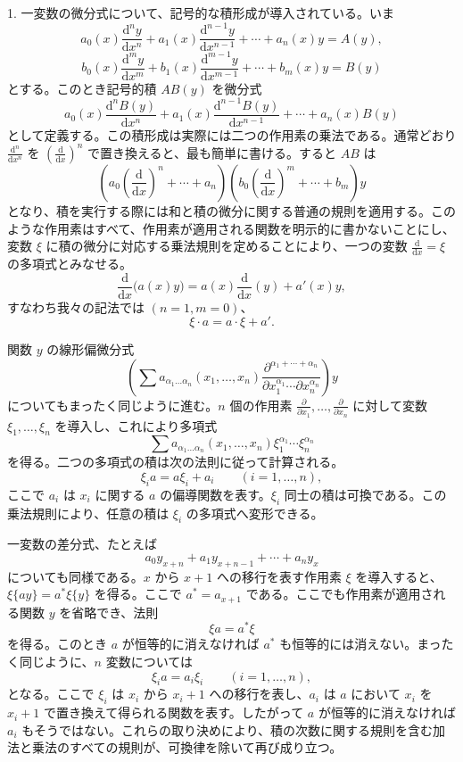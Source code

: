 \documentclass[11pt]{article}
\providecommand{\dd}{\mathrm d}
\providecommand{\p}{\partial}
\begin{document}
1. 一変数の微分式について、記号的な積形成が導入されている。いま
\[
 a_0(x)\frac{\dd^n y}{\dd x^n}+a_1(x)\frac{\dd^{n-1}y}{\dd x^{n-1}}+\cdots+a_n(x)y=A(y),
\]
\[
 b_0(x)\frac{\dd^m y}{\dd x^m}+b_1(x)\frac{\dd^{m-1}y}{\dd x^{m-1}}+\cdots+b_m(x)y=B(y)
\]
とする。このとき記号的積 $AB(y)$ を微分式
\[
 a_0(x)\frac{\dd^n B(y)}{\dd x^n}+a_1(x)\frac{\dd^{n-1}B(y)}{\dd x^{n-1}}+\cdots+a_n(x)B(y)
\]
として定義する。この積形成は実際には二つの作用素の乗法である。通常どおり $\frac{\dd^n}{\dd x^n}$ を $\left(\frac{\dd}{\dd x}\right)^n$ で置き換えると、最も簡単に書ける。すると $AB$ は
\[
 \left(a_0\left(\frac{\dd}{\dd x}\right)^n+\cdots+a_n\right)
 \left(b_0\left(\frac{\dd}{\dd x}\right)^m+\cdots+b_m\right)y
\]
となり、積を実行する際には和と積の微分に関する普通の規則を適用する。このような作用素はすべて、作用素が適用される関数を明示的に書かないことにし、変数 $\xi$ に積の微分に対応する乗法規則を定めることにより、一つの変数 $\frac{\dd}{\dd x}=\xi$ の多項式とみなせる。
\[
 \frac{\dd}{\dd x}\bigl(a(x)y\bigr)=a(x)\frac{\dd}{\dd x}(y)+a'(x)y,
\]
すなわち我々の記法では $(n=1,m=0)$、
\begin{equation}
 \xi\cdot a=a\cdot\xi+a'.
\tag{1}
\end{equation}

関数 $y$ の線形偏微分式
\[
 \left(\sum a_{\alpha_1\ldots\alpha_n}(x_1,\ldots,x_n)
 \frac{\p^{\alpha_1+\cdots+\alpha_n}}
 {\p x_1^{\alpha_1}\cdots\p x_n^{\alpha_n}}\right)y
\]
についてもまったく同じように進む。$n$ 個の作用素 $\frac{\p}{\p x_1},\ldots,\frac{\p}{\p x_n}$ に対して変数 $\xi_1,
\ldots,\xi_n$ を導入し、これにより多項式
\[
 \sum a_{\alpha_1\ldots\alpha_n}(x_1,\ldots,x_n)
 \xi_1^{\alpha_1}\cdots\xi_n^{\alpha_n}
\]
を得る。二つの多項式の積は次の法則に従って計算される。
\begin{equation}
 \xi_i a=a\xi_i+a_i \qquad (i=1,\ldots,n),
\tag{2}
\end{equation}
ここで $a_i$ は $x_i$ に関する $a$ の偏導関数を表す。$\xi_i$ 同士の積は可換である。この乗法規則により、任意の積は $\xi_i$ の多項式へ変形できる。

一変数の差分式、たとえば
\[
 a_0y_{x+n}+a_1y_{x+n-1}+\cdots+a_ny_x
\]
についても同様である。$x$ から $x+1$ への移行を表す作用素 $\xi$ を導入すると、$\xi\{ay\}=a^*\xi\{y\}$ を得る。ここで $a^*=a_{x+1}$ である。ここでも作用素が適用される関数 $y$ を省略でき、法則
\begin{equation}
 \xi a=a^*\xi
\tag{3}
\end{equation}
を得る。このとき $a$ が恒等的に消えなければ $a^*$ も恒等的には消えない。まったく同じように、$n$ 変数については
\begin{equation}
 \xi_i a=a_i\xi_i\qquad (i=1,\ldots,n),
\tag{4}
\end{equation}
となる。ここで $\xi_i$ は $x_i$ から $x_i+1$ への移行を表し、$a_i$ は $a$ において $x_i$ を $x_i+1$ で置き換えて得られる関数を表す。したがって $a$ が恒等的に消えなければ $a_i$ もそうではない。これらの取り決めにより、積の次数に関する規則を含む加法と乗法のすべての規則が、可換律を除いて再び成り立つ。
\end{document}
